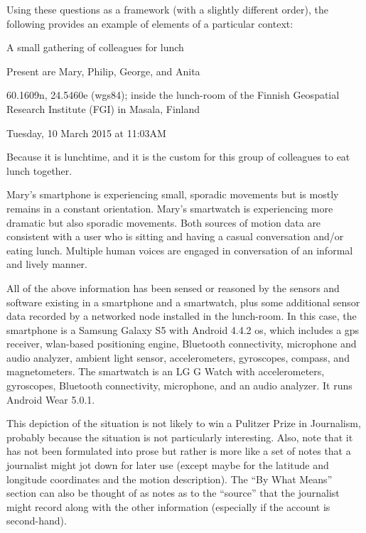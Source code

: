 Using these questions as a framework (with a slightly different order), the following provides an example of elements of a particular context:
%
\begin{bold_description}
\item[What:]A small gathering of colleagues for lunch
\item[Who:] Present are Mary, Philip, George, and Anita
\item[Where:]60.1609\textdegree{}\acrshort{n}, 24.5460\textdegree{}\acrshort{e} (\acrshort{wgs84}); inside the lunch-room of the Finnish Geospatial Research Institute (FGI) in Masala, Finland
\item[When:]Tuesday, 10 March 2015 at 11:03AM
\item[Why:]Because it is lunchtime, and it is the custom for this group of colleagues to eat lunch together.
\item[In What Manner:] Mary's smartphone is experiencing small, sporadic movements but is mostly remains in a constant orientation. Mary's smartwatch is experiencing more dramatic but also sporadic movements. Both sources of motion data are consistent with a user who is sitting and having a casual conversation and/or eating lunch. Multiple human voices are engaged in conversation of an informal and lively manner.
\item[By What Means:]All of the above information has been sensed or reasoned by the sensors and software existing in a smartphone and a smartwatch, plus some additional sensor data recorded by a networked node installed in the lunch-room. In this case, the smartphone is a Samsung Galaxy S5 with Android 4.4.2 \gls{os}, which includes a \gls{gps} receiver, \acrshort{wlan}-based positioning engine, Bluetooth connectivity, microphone and audio analyzer, ambient light sensor, accelerometers, gyroscopes, compass, and magnetometers. The smartwatch is an LG G Watch with accelerometers, gyroscopes, Bluetooth connectivity, microphone, and an audio analyzer. It runs Android Wear 5.0.1.
\end{bold_description}

This depiction of the situation is not likely to win a Pulitzer Prize in Journalism, probably because the situation is not particularly interesting. Also, note that it has not been formulated into prose but rather is more like a set of notes that a journalist might jot down for later use (except maybe for the latitude and longitude coordinates and the motion description). The ``By What Means'' section can also be thought of as notes as to the ``source'' that the journalist might record along with the other information (especially if the account is second-hand).

